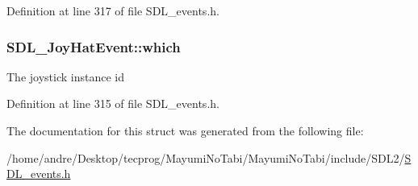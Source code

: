 Definition at line 317 of file S\-D\-L\-\_\-events.\-h.

\hypertarget{struct_s_d_l___joy_hat_event_ac9d9bb179f9116d16b3da47cacd74b55}{
\subsubsection[{which}]{ S\-D\-L\-\_\-\-Joy\-Hat\-Event\-::which}}\label{struct_s_d_l___joy_hat_event_ac9d9bb179f9116d16b3da47cacd74b55}
The joystick instance id 

Definition at line 315 of file S\-D\-L\-\_\-events.\-h.



The documentation for this struct was generated from the following file\-:\begin{DoxyCompactItemize}
\item 
/home/andre/\-Desktop/tecprog/\-Mayumi\-No\-Tabi/\-Mayumi\-No\-Tabi/include/\-S\-D\-L2/\hyperlink{_s_d_l__events_8h}{S\-D\-L\-\_\-events.\-h}\end{DoxyCompactItemize}
